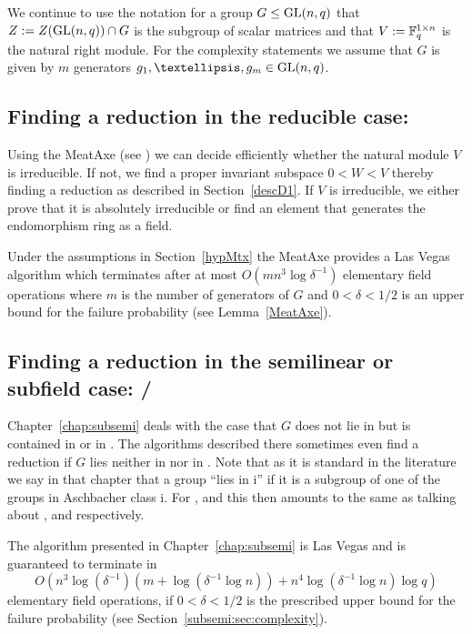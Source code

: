 We continue to use the notation for a group $G \le \GL(n,q)$ that
$Z := Z(\GL(n,q)) \cap G$ is the subgroup of scalar matrices and that
$V := \mathbb{F}_q^{1 \times n}$ is the natural right module. For the
complexity statements we assume that $G$ is given by $m$ generators
$g_1, \ldots, g_m \in \GL(n,q)$.

\subsection{Finding a reduction in the reducible case: }
\label{solveC1}

Using the MeatAxe (see \cite{MeatAxeHoltRees, IL, MeatAxeRP}) we can
decide efficiently whether the natural module $V$ is
irreducible. If not, we find a proper invariant subspace $0<W<V$
thereby finding a reduction as described in Section~\ref{descD1}. 
If $V$ is irreducible, we either prove
that it is absolutely irreducible or find an element that generates
the endomorphism ring as a field.

Under the assumptions in Section~\ref{hypMtx} the MeatAxe provides a
Las Vegas algorithm which terminates
after at most $O(mn^3\log \delta^{-1})$ elementary field operations where $m$
is the number of generators of $G$ and $0 < \delta < 1/2$ is an upper
bound for the failure probability (see Lemma~\ref{MeatAxe}).


\subsection{Finding a reduction in the semilinear or subfield case:
/}
\label{solveC3C5}

Chapter~\ref{chap:subsemi} deals with the case that $G$ does not lie
in  but is contained in  or in . The algorithms described
there sometimes even find a reduction if $G$ lies neither in  nor
in . Note that as it is standard in the literature we say in that
chapter that a group ``lies in \CC i'' if it is a subgroup of one of
the groups in Aschbacher class \CC i. For ,  and  this then 
amounts to the same as talking about ,  and  respectively.

The algorithm presented in Chapter~\ref{chap:subsemi} is Las Vegas and is
guaranteed to terminate in 
\[ O(n^3\log(\delta^{-1})(m+\log(\delta^{-1} \log n))
   + n^4\log(\delta^{-1} \log n) \log q) \]
elementary field operations,
if $0 < \delta < 1/2$ is the prescribed upper bound for the failure
probability (see Section~\ref{subsemi:sec:complexity}).

